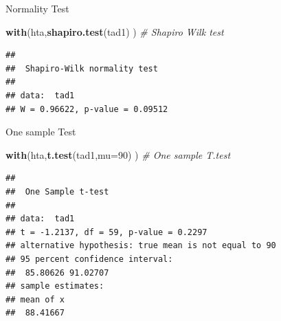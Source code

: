 \documentclass[
  ignorenonframetext,
]{beamer}
\newenvironment{Shaded}{\begin{snugshade}}{\end{snugshade}}
\newcommand{\CommentTok}[1]{\textcolor[rgb]{0.56,0.35,0.01}{\textit{#1}}}
\newcommand{\DataTypeTok}[1]{\textcolor[rgb]{0.13,0.29,0.53}{#1}}
\newcommand{\DecValTok}[1]{\textcolor[rgb]{0.00,0.00,0.81}{#1}}
\newcommand{\KeywordTok}[1]{\textcolor[rgb]{0.13,0.29,0.53}{\textbf{#1}}}
\newcommand{\NormalTok}[1]{#1}
\begin{document}
\begin{frame}[fragile]{Normality Test}
\protect\hypertarget{normality-test}{}

\small

\begin{Shaded}
\begin{Highlighting}[]
\KeywordTok{with}\NormalTok{(hta,}\KeywordTok{shapiro.test}\NormalTok{(tad1) ) }\CommentTok{# Shapiro Wilk test}
\end{Highlighting}
\end{Shaded}

\begin{verbatim}
## 
##  Shapiro-Wilk normality test
## 
## data:  tad1
## W = 0.96622, p-value = 0.09512
\end{verbatim}

\end{frame}

\begin{frame}[fragile]{One sample Test}
\protect\hypertarget{one-sample-test}{}

\small

\begin{Shaded}
\begin{Highlighting}[]
\KeywordTok{with}\NormalTok{(hta,}\KeywordTok{t.test}\NormalTok{(tad1,}\DataTypeTok{mu=}\DecValTok{90}\NormalTok{) ) }\CommentTok{# One sample T.test}
\end{Highlighting}
\end{Shaded}

\begin{verbatim}
## 
##  One Sample t-test
## 
## data:  tad1
## t = -1.2137, df = 59, p-value = 0.2297
## alternative hypothesis: true mean is not equal to 90
## 95 percent confidence interval:
##  85.80626 91.02707
## sample estimates:
## mean of x 
##  88.41667
\end{verbatim}

\end{frame}
\end{document}

